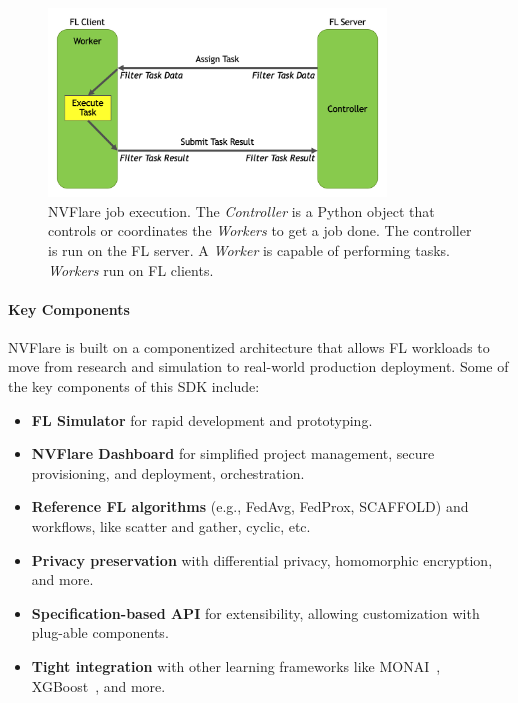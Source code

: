 \documentclass[11pt]{article}
\begin{document}
\begin{figure}[htbp]
    \centering
    \includegraphics[width=0.8\textwidth]{submissions/HolgerRoth/fig/controller_worker_flow.png}
    \caption{NVFlare job execution. The \textit{Controller} is a Python object that controls or coordinates the \textit{Workers} to get a job done. The controller is run on the FL server. A \textit{Worker} is capable of performing tasks. \textit{Workers} run on FL clients. \label{fig:job}}
\end{figure}

\paragraph{Key Components}
NVFlare is built on a componentized architecture that allows FL workloads to move from research and simulation to real-world production deployment. Some of the key components of this SDK include:

\begin{itemize}%
    \item \textbf{FL Simulator} for rapid development and prototyping.
    \item \textbf{NVFlare Dashboard} for simplified project management, secure provisioning, and deployment, orchestration.
    \item \textbf{Reference FL algorithms} (e.g., FedAvg, FedProx, SCAFFOLD) and workflows, like scatter and gather, cyclic, etc.
    \item \textbf{Privacy preservation} with differential privacy, homomorphic encryption, and more.
    \item \textbf{Specification-based API} for extensibility, allowing customization with plug-able components.
    \item \textbf{Tight integration} with other learning frameworks like MONAI~\cite{cardoso2022monai}, XGBoost~\cite{Chen:2016:XST:2939672.2939785}, and more.
\end{itemize}
\end{document}
